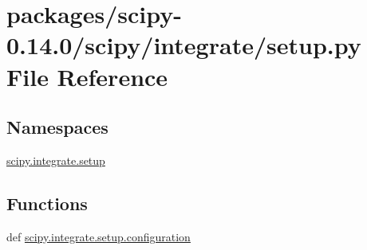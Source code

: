 \hypertarget{packages_2scipy-0_814_80_2scipy_2integrate_2setup_8py}{}\section{packages/scipy-\/0.14.0/scipy/integrate/setup.py File Reference}
\label{packages_2scipy-0_814_80_2scipy_2integrate_2setup_8py}
\subsection*{Namespaces}
\begin{DoxyCompactItemize}
\item 
 \hyperlink{namespacescipy_1_1integrate_1_1setup}{scipy.\+integrate.\+setup}
\end{DoxyCompactItemize}
\subsection*{Functions}
\begin{DoxyCompactItemize}
\item 
def \hyperlink{namespacescipy_1_1integrate_1_1setup_a5a3dde42e71c8950ce3770f25eaf42e3}{scipy.\+integrate.\+setup.\+configuration}
\end{DoxyCompactItemize}
